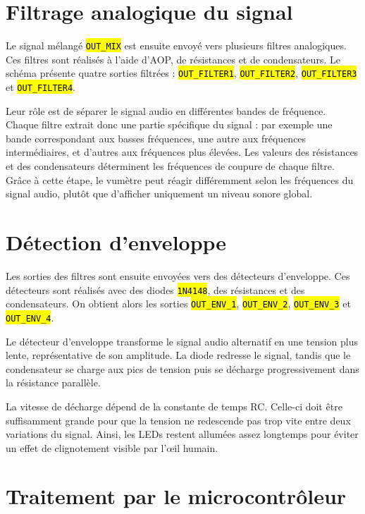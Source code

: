 \documentclass{report}
\let\OldTexttt\texttt
\renewcommand{\texttt}[1]{\OldTexttt{\hl{#1}}}
\begin{document}
\section{Filtrage analogique du signal}

Le signal mélangé \texttt{OUT\_MIX} est ensuite envoyé vers plusieurs filtres analogiques. Ces filtres sont réalisés à l'aide d'AOP, de résistances et de condensateurs. Le schéma présente quatre sorties filtrées : \texttt{OUT\_FILTER1}, \texttt{OUT\_FILTER2}, \texttt{OUT\_FILTER3} et \texttt{OUT\_FILTER4}.

Leur rôle est de séparer le signal audio en différentes bandes de fréquence. Chaque filtre extrait donc une partie spécifique du signal : par exemple une bande correspondant aux basses fréquences, une autre aux fréquences intermédiaires, et d'autres aux fréquences plus élevées. Les valeurs des résistances et des condensateurs déterminent les fréquences de coupure de chaque filtre. Grâce à cette étape, le vumètre peut réagir différemment selon les fréquences du signal audio, plutôt que d'afficher uniquement un niveau sonore global.

\section{Détection d'enveloppe}

Les sorties des filtres sont ensuite envoyées vers des détecteurs d'enveloppe. Ces détecteurs sont réalisés avec des diodes \texttt{1N4148}, des résistances et des condensateurs. On obtient alors les sorties \texttt{OUT\_ENV\_1}, \texttt{OUT\_ENV\_2}, \texttt{OUT\_ENV\_3} et \texttt{OUT\_ENV\_4}.

Le détecteur d'enveloppe transforme le signal audio alternatif en une tension plus lente, représentative de son amplitude. La diode redresse le signal, tandis que le condensateur se charge aux pics de tension puis se décharge progressivement dans la résistance parallèle.

La vitesse de décharge dépend de la constante de temps RC. Celle-ci doit être suffisamment grande pour que la tension ne redescende pas trop vite entre deux variations du signal. Ainsi, les LEDs restent allumées assez longtemps pour éviter un effet de clignotement visible par l'\oe{}il humain.

\section{Traitement par le microcontrôleur}
\end{document}
